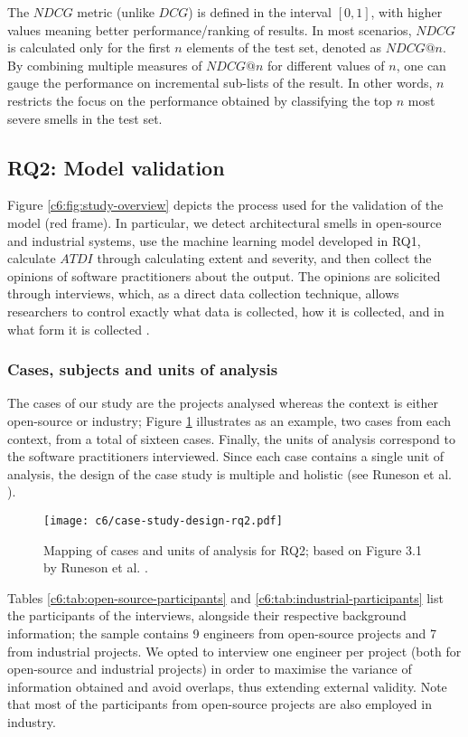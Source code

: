 The $NDCG$ metric (unlike $DCG$) is defined in the interval $[0, 1]$, with higher values meaning better performance/ranking of results.
In most scenarios, $NDCG$ is calculated only for the first $n$ elements of the test set, denoted as $NDCG@n$.
By combining multiple measures of $NDCG@n$ for different values of $n$, one can gauge the performance on incremental sub-lists of the result.
In other words, $n$ restricts the focus on the performance obtained by classifying the top $n$ most severe smells in the test set.

\subsection{RQ2: Model validation}\label{c6:sec:rq2-methodology}
Figure \ref{c6:fig:study-overview} depicts the process used for the validation of the model (red frame).
In particular, we detect architectural smells in open-source and industrial systems, use the machine learning model developed in RQ1, calculate $ATDI$ through calculating extent and severity, and then collect the opinions of software practitioners about the output. 
The opinions are solicited through interviews, which, as a direct data collection technique, allows researchers to control exactly what data is collected, how it is collected, and in what form it is collected \cite{Runeson2012,Lethbridge2005}. 

\subsubsection{Cases, subjects and units of analysis}
The cases of our study are the projects analysed whereas the context is either open-source or industry; Figure \ref{c6:fig:case-study-design-rq2} illustrates as an example, two cases from each context, from a total of sixteen cases. 
Finally, the units of analysis correspond to the software practitioners interviewed. Since each case contains a single unit of analysis, the design of the case study is multiple and holistic (see Runeson et al. \cite{Runeson2012}).

\begin{figure}
    \centering
    \texttt{[image: c6/case-study-design-rq2.pdf]}
    \caption{Mapping of cases and units of analysis for RQ2; based on Figure 3.1 by Runeson et al. \cite{Runeson2012}.}\label{c6:fig:case-study-design-rq2}
\end{figure}

Tables \ref{c6:tab:open-source-participants} and \ref{c6:tab:industrial-participants} list the participants of the interviews, alongside their respective background information; the sample contains 9 engineers from open-source projects and 7 from industrial projects.
We opted to interview one engineer per project (both for open-source and  industrial projects) in order to maximise the variance of information obtained and avoid overlaps, thus extending external validity.
Note that most of the participants from open-source projects are also employed in industry.

